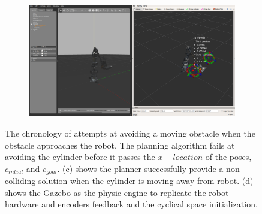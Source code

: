 \begin{figure}
\begin{subfigure}[b]{0.4\linewidth}
    \caption{}
  \end{subfigure}
  \begin{subfigure}[b]{0.4\linewidth}
    \includegraphics[width=\linewidth]{avoiding_moving_obs_gazebo.png}
    \caption{}
  \end{subfigure}

  \caption{The chronology of attempts at avoiding a moving obstacle
  when the obstacle approaches the robot. The planning algorithm fails at
  avoiding the cylinder before it passes the $x-location$ of the poses, $c_{intial}$
  and $c_{goal}$. (c) shows the planner successfully provide 
  a non-colliding solution when the cylinder is moving away from robot. (d) shows the Gazebo as 
  the physic engine to replicate the robot hardware and encoders feedback and
  the cyclical space initialization.}
  \label{fig:avoiding_moving_obs}
\end{figure}
